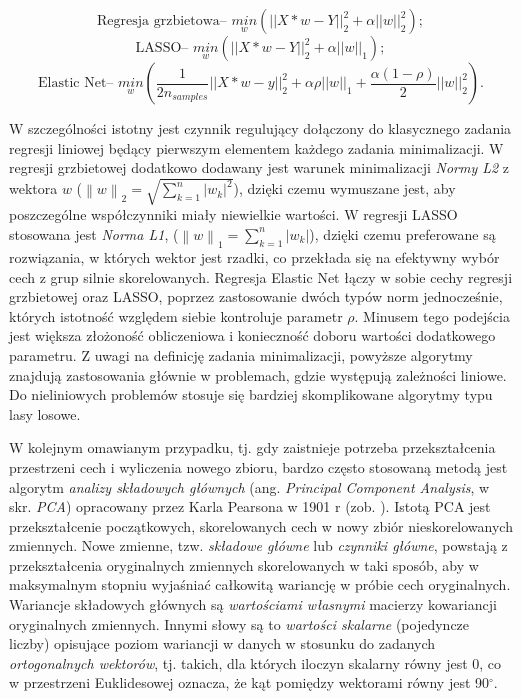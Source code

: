 \begin{equation}
\textrm{Regresja grzbietowa-- } \underset{w}{min} (||X*w-Y||_2^2 + \alpha ||w||_2^2);
\label{equ:ridgeReg}
\end{equation}
\begin{equation}
\textrm{LASSO-- } \underset{w}{min} (||X*w-Y||_2^2 + \alpha ||w||_1);
\label{equ:lassoReg}
\end{equation}
\begin{equation}
\textrm{Elastic Net-- } \underset{w}{min} ({ \frac{1}{2n_{samples}} ||X*w - y||_2 ^ 2 + \alpha \rho ||w||_1 + \frac{\alpha(1-\rho)}{2} ||w||_2 ^ 2}).
\label{equ:elasticNet}
\end{equation}

W szczególności istotny jest czynnik regulujący dołączony do klasycznego zadania regresji liniowej będący pierwszym elementem każdego zadania minimalizacji. W regresji grzbietowej dodatkowo dodawany jest warunek minimalizacji \textit{Normy L2} z wektora $w$ ($\left \| w \right \|_2 =\sqrt{ \sum_{k=1}^{n}\left |w_k  \right |^2}$), dzięki czemu wymuszane jest, aby poszczególne współczynniki miały niewielkie wartości. W regresji LASSO stosowana jest \textit{Norma L1}, ($\left \| w \right \|_1 = \sum_{k=1}^{n}\left |w_k  \right |$), dzięki czemu preferowane są rozwiązania, w których wektor jest rzadki, co przekłada się na efektywny wybór cech z grup silnie skorelowanych. Regresja Elastic Net łączy w sobie cechy regresji grzbietowej oraz LASSO, poprzez zastosowanie dwóch typów norm jednocześnie, których istotność względem siebie kontroluje parametr $\rho$. Minusem tego podejścia jest większa złożoność obliczeniowa i konieczność doboru wartości dodatkowego parametru. Z uwagi na definicję zadania minimalizacji, powyższe algorytmy znajdują zastosowania głównie w problemach, gdzie występują zależności liniowe. Do nieliniowych problemów stosuje się bardziej skomplikowane algorytmy typu lasy losowe.

W kolejnym omawianym przypadku, tj. gdy zaistnieje potrzeba przekształcenia przestrzeni cech i wyliczenia nowego zbioru, bardzo często stosowaną metodą jest algorytm \textit{analizy składowych głównych} (ang. \textit{Principal Component Analysis}, w skr. \textit{PCA}) opracowany przez Karla Pearsona w 1901 r (zob. \cite{PCA}). Istotą PCA jest przekształcenie początkowych, skorelowanych cech w nowy zbiór nieskorelowanych zmiennych. Nowe zmienne, tzw. \textit{składowe główne} lub \textit{czynniki główne}, powstają z przekształcenia oryginalnych zmiennych skorelowanych w taki sposób, aby w maksymalnym stopniu wyjaśniać całkowitą wariancję w próbie cech oryginalnych. Wariancje składowych głównych są \textit{wartościami własnymi} macierzy kowariancji oryginalnych zmiennych. Innymi słowy są to \textit{wartości skalarne} (pojedyncze liczby) opisujące poziom wariancji w danych w stosunku do zadanych \textit{ortogonalnych wektorów}, tj. takich, dla których iloczyn skalarny równy jest 0, co \linebreak w przestrzeni Euklidesowej oznacza, że kąt pomiędzy wektorami równy jest 90$^\circ$.

